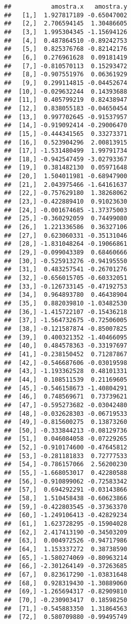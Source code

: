 \documentclass[]{book}
\begin{document}
\begin{verbatim}
##           amostra.x   amostra.y
##   [1,]  1.927817189 -0.65047002
##   [2,]  2.706594145  1.30486605
##   [3,]  1.995304345 -1.15694126
##   [4,]  0.487864510 -0.89242753
##   [5,]  0.825376768 -0.82142176
##   [6,]  0.276961628  0.09181419
##   [7,] -0.810570113  0.15293472
##   [8,] -0.907551976  0.06361929
##   [9,]  0.299114815 -0.04452674
##  [10,] -0.029632244  0.14393688
##  [11,]  0.405799219  0.82438947
##  [12,]  0.838055183 -0.04650454
##  [13,]  0.997702645 -0.91537957
##  [14,] -0.919092414 -0.29006470
##  [15,] -0.444341565  0.33273371
##  [16,]  0.523904296  2.00813915
##  [17,] -1.531480499  1.99791734
##  [18,] -0.942547459 -3.02793367
##  [19,]  0.381482130  0.05971648
##  [20,]  1.504011981 -0.68947900
##  [21,]  2.043975466 -1.64161637
##  [22,] -0.757629180  1.38268062
##  [23,] -0.422889410  0.91023630
##  [24,] -0.001674685 -1.37375003
##  [25,] -0.360292059  0.74499080
##  [26,]  1.221336586  0.36327106
##  [27,]  0.623060331 -0.35131046
##  [28,] -1.831048264 -0.19066861
##  [29,] -0.099043389  0.68460666
##  [30,] -0.525913276 -0.94195550
##  [31,]  0.483257541 -0.26701276
##  [32,] -0.656015705 -0.60332051
##  [33,] -0.126733145 -0.47192753
##  [34,]  0.964893780  0.46438904
##  [35,]  0.882039810 -1.03482530
##  [36,] -1.415722107 -0.15436218
##  [37,] -1.564732675 -0.72506005
##  [38,] -0.121587874 -0.85007825
##  [39,]  0.400321352 -1.40466095
##  [40,]  0.484578363 -0.33197697
##  [41,] -0.238150452  0.71287867
##  [42,] -0.546687606 -0.03019598
##  [43,] -1.193362528  0.48101331
##  [44,]  0.108511539  0.21169605
##  [45,] -0.546158673 -1.40804291
##  [46,]  0.748569671  0.73739621
##  [47,] -0.595273682 -0.03042480
##  [48,] -0.032628303 -0.06719533
##  [49,] -0.815600275  0.13873260
##  [50,] -0.333844213 -0.08129736
##  [51,]  0.046084058 -0.07229265
##  [52,] -0.910174600 -0.47645812
##  [53,] -0.281181833  0.72777533
##  [54,] -0.786157066  2.56200230
##  [55,] -1.668053017  0.42280588
##  [56,] -0.910899062 -0.72583342
##  [57,]  0.694292291 -0.03143866
##  [58,]  1.510458438 -0.60623866
##  [59,] -0.422803545 -0.37363370
##  [60,] -1.249106413 -0.42829234
##  [61,]  1.623728295 -0.15904028
##  [62,]  2.417413190 -0.34503209
##  [63,]  0.004972526 -0.94717986
##  [64,]  1.153337272  0.38738590
##  [65,] -1.580274069 -0.80963214
##  [66,] -2.301264149 -0.37263685
##  [67,]  0.823617290 -1.03831648
##  [68,]  0.928319430 -1.30889060
##  [69,] -1.265694317 -0.82909810
##  [70,] -0.230903417  0.18598250
##  [71,] -0.545883350  1.31864563
##  [72,]  0.580709880 -0.99495749

\end{verbatim}
\end{document}
